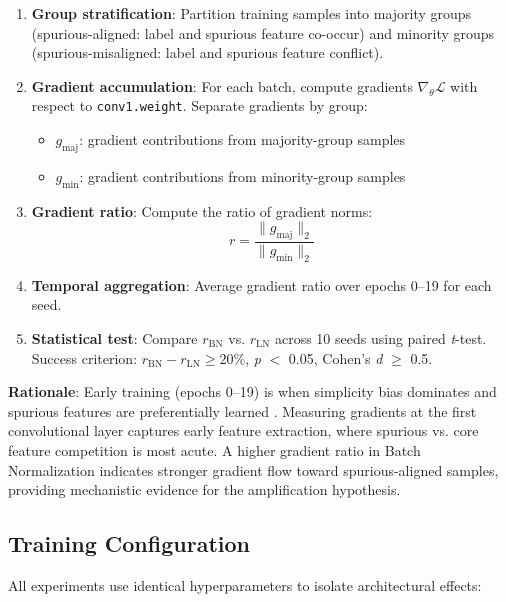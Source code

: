 \begin{enumerate}
\item \textbf{Group stratification}: Partition training samples into majority groups (spurious-aligned: label and spurious feature co-occur) and minority groups (spurious-misaligned: label and spurious feature conflict).

\item \textbf{Gradient accumulation}: For each batch, compute gradients $\nabla_{\theta} \mathcal{L}$ with respect to \texttt{conv1.weight}. Separate gradients by group:
   \begin{itemize}
   \item $g_{\text{maj}}$: gradient contributions from majority-group samples
   \item $g_{\text{min}}$: gradient contributions from minority-group samples
   \end{itemize}

\item \textbf{Gradient ratio}: Compute the ratio of gradient norms:
\begin{equation}
r = \frac{\|g_{\text{maj}}\|_2}{\|g_{\text{min}}\|_2}
\end{equation}

\item \textbf{Temporal aggregation}: Average gradient ratio over epochs 0--19 for each seed.

\item \textbf{Statistical test}: Compare $r_{\text{BN}}$ vs. $r_{\text{LN}}$ across 10 seeds using paired \emph{t}-test. Success criterion: $r_{\text{BN}} - r_{\text{LN}} \geq 20\%$, \emph{p} $<$ 0.05, Cohen's \emph{d} $\geq$ 0.5.
\end{enumerate}

\textbf{Rationale}: Early training (epochs 0--19) is when simplicity bias dominates and spurious features are preferentially learned \cite{toneva2018empirical}. Measuring gradients at the first convolutional layer captures early feature extraction, where spurious vs. core feature competition is most acute. A higher gradient ratio in Batch Normalization indicates stronger gradient flow toward spurious-aligned samples, providing mechanistic evidence for the amplification hypothesis.

\subsection{Training Configuration}

All experiments use identical hyperparameters to isolate architectural effects:

